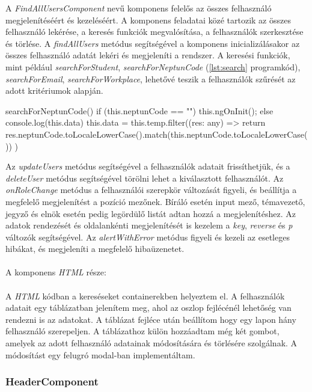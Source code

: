 A \textit{FindAllUsersComponent} nevű komponens felelős az összes felhasználó megjelenítéséért és kezeléséért. A komponens feladatai közé tartozik az összes felhasználó lekérése, a keresés funkciók megvalósítása, a felhasználók szerkesztése és törlése. A \textit{findAllUsers} metódus segítségével a komponens inicializálásakor az összes felhasználó adatát lekéri és megjeleníti a rendszer. A keresési funkciók, mint például \textit{searchForStudent}, \textit{searchForNeptunCode} (\ref{lst:search} programkód), \textit{searchForEmail}, \textit{searchForWorkplace}, lehetővé teszik a felhasználók szűrését az adott kritériumok alapján. 
\\
\begin{typescript}[caption={Keresés Neptun kód alapján},captionpos=b,label={lst:search}]
searchForNeptunCode() {
    if (this.neptunCode == "") {
      this.ngOnInit();
    } else {
      console.log(this.data)
      this.data = this.temp.filter((res: any) => {
        return res.neptunCode.toLocaleLowerCase().match(this.neptunCode.toLocaleLowerCase())
    })
  }
}
\end{typescript}  
Az \textit{updateUsers} metódus segítségével a felhasználók adatait frissíthetjük, és a \textit{deleteUser} metódus segítségével törölni lehet a kiválasztott felhasználót. Az \textit{onRoleChange} metódus a felhasználói szerepkör változását figyeli, és beállítja a megfelelő megjelenítést a pozíció mezőnek. Bíráló esetén input mező, témavezető, jegyző és elnök esetén pedig legördülő listát adtan hozzá a megjelenítéshez. Az adatok rendezését és oldalankénti megjelenítését is kezelem a \textit{key}, \textit{reverse} és \textit{p} változók segítségével. Az \textit{alertWithError} metódus figyeli és kezeli az esetleges hibákat, és megjeleníti a megfelelő hibaüzenetet.\\
\\
A komponens \textit{HTML} része:\\
\\
A \textit{HTML} kódban a kereséseket containerekben helyeztem el. A felhasználók adatait egy táblázatban jelenítem meg, ahol az oszlop fejlécénél lehetőség van rendezni is az adatokat. A táblázat fejléce után beállítom hogy egy lapon hány felhasználó szerepeljen. A táblázathoz külön hozzáadtam még két gombot, amelyek az adott felhasználó adatainak módosítására és törlésére szolgálnak. A módosítást egy felugró modal-ban implementáltam.


\subsubsection{HeaderComponent}

